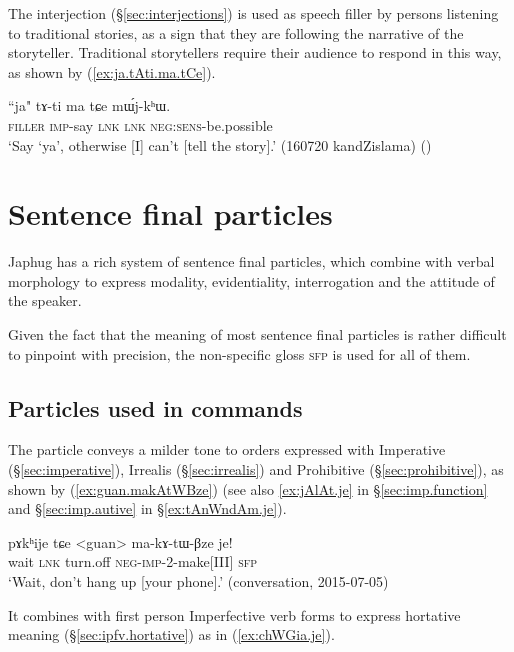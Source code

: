 The interjection  (§\ref{sec:interjections}) is used as speech filler by persons listening to traditional stories, as a sign that they are following the narrative of the storyteller. Traditional storytellers require their audience to respond in this way, as shown by (\ref{ex:ja.tAti.ma.tCe}).

\begin{exe}
\ex \label{ex:ja.tAti.ma.tCe}
\gll ``ja" tɤ-ti ma tɕe mɯ́j-kʰɯ. \\
\textsc{filler} \textsc{imp}-say \textsc{lnk} \textsc{lnk} \textsc{neg}:\textsc{sens}-be.possible \\
\glt `Say `ya', otherwise [I] can't [tell the story].' (160720 kandZislama)
()
\end{exe}

\section{Sentence final particles} \label{sec:sfp}
Japhug has a rich system of sentence final particles, which combine with verbal morphology to express modality, evidentiality, interrogation and the attitude of the speaker.

Given the fact that the meaning of most sentence final particles is rather difficult to pinpoint with precision, the non-specific gloss \textsc{sfp} is used for all of them.
 
\subsection{Particles used in commands} \label{sec:fsp.imp}
The particle  conveys a milder tone to orders expressed with Imperative (§\ref{sec:imperative}), Irrealis (§\ref{sec:irrealis}) and Prohibitive (§\ref{sec:prohibitive}), as shown by (\ref{ex:guan.makAtWBze}) (see also \ref{ex:jAlAt.je} in §\ref{sec:imp.function} and §\ref{sec:imp.autive} in §\ref{ex:tAnWndAm.je}).


\begin{exe}
\ex \label{ex:guan.makAtWBze}
\gll pɤkʰije tɕe <guan> ma-kɤ-tɯ-βze je! \\
wait \textsc{lnk} turn.off \textsc{neg}-\textsc{imp}-2-make[III] \textsc{sfp} \\
\glt `Wait, don't hang up [your phone].' (conversation, 2015-07-05)
\end{exe}

It combines with first person Imperfective verb forms to express hortative meaning (§\ref{sec:ipfv.hortative}) as in (\ref{ex:chWGia.je}). 

